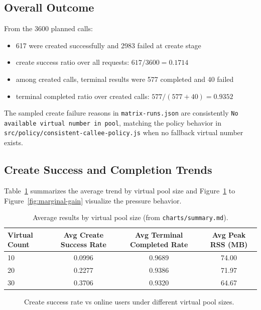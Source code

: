 \documentclass[12pt,a4paper]{report}
\newcommand{\MatrixChartsDir}{../data/matrix-1775300745300/charts}
\begin{document}
\subsection{Overall Outcome}
\label{subsec:overall-outcome}
From the 3600 planned calls:
\begin{itemize}
  \item 617 were created successfully and 2983 failed at create stage
  \item create success ratio over all requests: \(617/3600=0.1714\)
  \item among created calls, terminal results were 577 completed and 40 failed
  \item terminal completed ratio over created calls: \(577/(577+40)=0.9352\)
\end{itemize}

The sampled create failure reasons in \texttt{matrix-runs.json} are consistently \texttt{No available virtual number in pool}, matching the policy behavior in \texttt{src/policy/consistent-callee-policy.js} when no fallback virtual number exists.

\subsection{Create Success and Completion Trends}
\label{subsec:success-trends}
Table~\ref{tab:virtual-summary} summarizes the average trend by virtual pool size and Figure~\ref{fig:create-success-line} to Figure~\ref{fig:marginal-gain} visualize the pressure behavior.

\begin{table}[H]
\centering
\caption{Average results by virtual pool size (from \texttt{charts/summary.md}).}
\label{tab:virtual-summary}
\begin{tabular}{lccc}
\toprule
Virtual Count & Avg Create Success Rate & Avg Terminal Completed Rate & Avg Peak RSS (MB) \\
\midrule
10 & 0.0996 & 0.9689 & 74.00 \\
20 & 0.2277 & 0.9386 & 71.97 \\
30 & 0.3706 & 0.9320 & 64.67 \\
\bottomrule
\end{tabular}
\end{table}

\begin{figure}[H]
\centering

\caption{Create success rate vs online users under different virtual pool sizes.}
\label{fig:create-success-line}
\end{figure}
\end{document}
